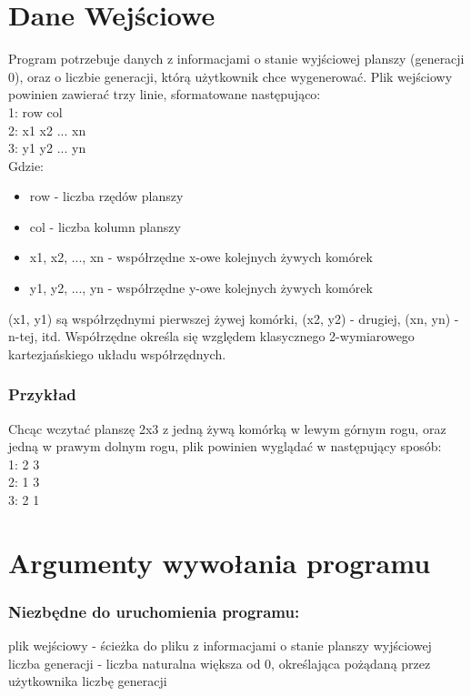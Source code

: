 \documentclass[11pt,a4paper]{report}
\begin{document}
\section{Dane Wejściowe}\label{sec:teskt}
Program potrzebuje danych z informacjami o stanie wyjściowej planszy (generacji 0),
oraz o liczbie generacji, którą użytkownik chce wygenerować.
Plik wejściowy powinien zawierać trzy linie, sformatowane następująco:\\
1: row col\\
2: x1 x2 ... xn\\
3: y1 y2 ... yn\\
Gdzie:
\begin {itemize}
\item row - liczba rzędów planszy
\item col - liczba kolumn planszy
\item x1, x2, ..., xn - współrzędne x-owe kolejnych żywych komórek
\item y1, y2, ..., yn - współrzędne y-owe kolejnych żywych komórek
\end {itemize}
(x1, y1) są współrzędnymi pierwszej żywej komórki, (x2, y2) - drugiej, (xn, yn) - n-tej, itd.
Współrzędne określa się względem klasycznego 2-wymiarowego kartezjańskiego układu współrzędnych.
\subsubsection {Przykład}
Chcąc wczytać planszę 2x3 z jedną żywą komórką w lewym górnym rogu, oraz jedną w prawym dolnym rogu,
plik powinien wyglądać w następujący sposób: \\
1: 2 3 \\
2: 1 3 \\
3: 2 1 
\newpage

\section{Argumenty wywołania programu}\label{sec:teskt}
\subsubsection {Niezbędne do uruchomienia programu:}
plik wejściowy - ścieżka do pliku z informacjami o stanie planszy wyjściowej\\
liczba generacji - liczba naturalna większa od 0, określająca pożądaną przez użytkownika liczbę generacji\\
\end{document}
